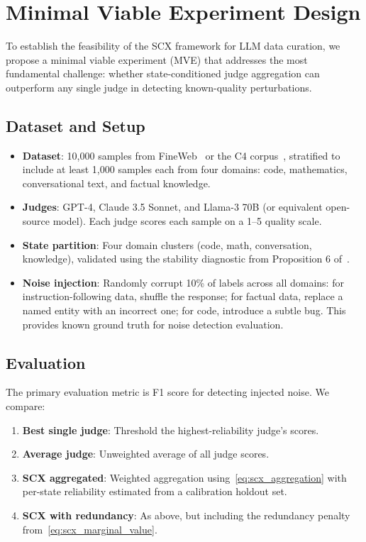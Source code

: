 \documentclass[11pt,twocolumn]{article}
\begin{document}
\section{Minimal Viable Experiment Design}

To establish the feasibility of the SCX framework for LLM data curation, we propose a minimal viable experiment (MVE) that addresses the most fundamental challenge: whether state-conditioned judge aggregation can outperform any single judge in detecting known-quality perturbations.

\subsection{Dataset and Setup}

\begin{itemize}
    \item \textbf{Dataset}: 10,000 samples from FineWeb~\cite{penedo2023refinedweb} or the C4 corpus~\cite{raffel2020}, stratified to include at least 1,000 samples each from four domains: code, mathematics, conversational text, and factual knowledge.
    \item \textbf{Judges}: GPT-4, Claude 3.5 Sonnet, and Llama-3 70B (or equivalent open-source model). Each judge scores each sample on a 1--5 quality scale.
    \item \textbf{State partition}: Four domain clusters (code, math, conversation, knowledge), validated using the stability diagnostic from Proposition 6 of~\cite{scx2026}.
    \item \textbf{Noise injection}: Randomly corrupt 10\% of labels across all domains: for instruction-following data, shuffle the response; for factual data, replace a named entity with an incorrect one; for code, introduce a subtle bug. This provides known ground truth for noise detection evaluation.
\end{itemize}

\subsection{Evaluation}

The primary evaluation metric is F1 score for detecting injected noise. We compare:
\begin{enumerate}
    \item \textbf{Best single judge}: Threshold the highest-reliability judge's scores.
    \item \textbf{Average judge}: Unweighted average of all judge scores.
    \item \textbf{SCX aggregated}: Weighted aggregation using~\eqref{eq:scx_aggregation} with per-state reliability estimated from a calibration holdout set.
    \item \textbf{SCX with redundancy}: As above, but including the redundancy penalty from~\eqref{eq:scx_marginal_value}.
\end{enumerate}
\end{document}
